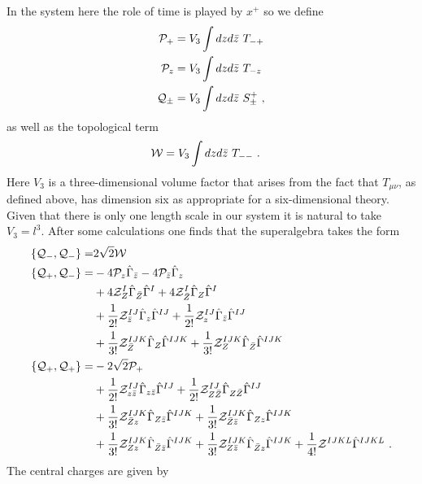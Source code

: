 \documentclass[12pt]{article}
\newcommand{\nn}{\nonumber}
\numberwithin{equation}{section}
\begin{document}
In the system here the role of time is played by $x^+$ so we define 
\begin{align}
{\cal P}_+ &= V_3\int dzd\bar z\  T_{-+}\nn\\
{\cal P}_z & = V_3\int dzd\bar z\   T_{-z}\nn\\
{\cal Q}_\pm & = V_3\int dzd\bar z \  S^+_{\pm}\ ,
\end{align}
as well as the topological term
\begin{align}
{\cal W} &=V_3\int dzd\bar z\  T_{--} \ .
\end{align}
Here $V_3$ is a three-dimensional volume factor that arises from the fact that $T_{\mu\nu}$, as defined above, has dimension six as appropriate for a six-dimensional theory.
Given that there is only one length scale in our system it is natural to take $V_3= l^3$.
After some calculations one finds that the superalgebra takes the form
\begin{align}
\{ {\cal Q}_-,{\cal Q}_-\}   = &  2\sqrt{2}{\cal W} \nn\\
\{{\cal Q}_+,{\cal Q}_-\}  = & -4  {\cal P}_z \hat {\Gamma}_{\bar{z}} -4  {\cal P}_{\bar{z}} \hat{\Gamma}_z\nn\\ 
&  +4 {\cal Z}_Z^I \hat{\Gamma}_{\bar{Z}} \hat{\Gamma}^I + 4   {\cal Z}^I_{\bar{Z}} \hat{\Gamma}_Z \hat{\Gamma}^I\nonumber \\
&+ \frac{1}{2!}{\cal  Z}^{IJ}_{\bar z}\hat{\Gamma}_z \hat{\Gamma}^{IJ } +\frac{1}{2!}  {\cal  Z}^{ IJ}_z\hat{\Gamma}_{\bar z} \hat{\Gamma}^{IJ } 
\nn\\
&+ \frac{1}{3!}{\cal Z}^{IJK}_{\bar Z}\hat{\Gamma}_Z \hat{\Gamma}^{IJK} + \frac{1}{3!}{\cal Z}^{ IJK}_Z\hat{\Gamma}_{\bar Z} \hat{\Gamma}^{IJK} \nn\\
\{{\cal Q}_+,{\cal Q}_+\}   =&  -2\sqrt{2}{\cal P}_+ \nn\\
&+\frac{1}{2!}{\cal Z}^{IJ}_{z\bar{z}} \hat{\Gamma}_{z\bar{z}}
\hat{\Gamma}^{IJ}+\frac{1}{2!}{\cal Z}_{ Z\bar{Z}}^{IJ}\hat{\Gamma}_{Z\bar{Z}}\hat{\Gamma}^{IJ}\nonumber \\
 & +\frac{1}{3!}{\cal Z}^{IJK}_{\bar{Z}z}\hat{\Gamma}_{Z \bar{z}}\hat{\Gamma}^{IJK}+\frac{1}{3!}{\cal Z}^{IJK}_{\bar{Z}\bar{z}  }\hat{\Gamma}_{Zz} \hat{\Gamma}^{IJK} \nonumber \\
 & +\frac{1}{3!}{\cal Z}^{IJK}_{  Z z} \hat{\Gamma}_{\bar{Z}\bar{z}}\hat{\Gamma}^{IJK}+\frac{1}{3!}{\cal Z}^{IJK}_{Z\bar{z}}\hat{\Gamma}_{\bar{Z}z }\hat{\Gamma}^{IJK}+\frac{1}{4!}{\cal Z}^{IJKL}\hat{\Gamma}^{IJKL}\ .
\end{align}
The central charges are given by
\end{document}

